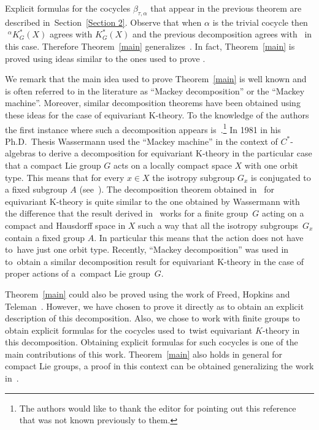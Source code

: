 \documentclass[pdftex]{sigma}
\theoremstyle{definition}
\numberwithin{equation}{section}
\begin{document}
Explicit formulas for the cocycles $\beta_{\tau,\alpha}$ that appear in the previous theorem
are described in~Section~\ref{Section 2}. Observe that when $\alpha$ is the trivial cocycle
then $\phantom{i}^{\alpha}K_{G}^{\ast}(X)$ agrees
with $K_{G}^{*}(X)$ and the previous decomposition agrees with~\cite[Theorem 3.2]{GomezUribe}
in this case. Therefore Theorem~\ref{main} generalizes~\cite[Theorem 3.2]{GomezUribe}. In fact,
Theorem~\ref{main} is proved using ideas similar to the ones used to prove
\cite[Theorem 3.2]{GomezUribe}.


We remark that the main idea used to prove Theorem~\ref{main} is well known and is often referred
to in the literature as ``Mackey decomposition'' or the ``Mackey machine''. Moreover, similar decomposition
theorems have been obtained using these ideas for the case of equivariant K-theory. To the knowledge of
the authors the first instance where such a decomposition appears is~\cite{Wassermann}.\footnote{The authors would like to thank the editor for pointing out this reference that was not
known previously to them.} In 1981 in his Ph.D.~Thesis Wassermann used the ``Mackey machine'' in
the context of $C^{*}$-algebras to derive a decomposition for equivariant K-theory in the particular
case that a compact Lie group $G$ acts on a locally compact space $X$ with one orbit type.
This means that for every $x\in X$ the isotropy subgroup $G_{x}$ is conjugated to a fixed subgroup $A$
(see~\cite[Theorem~7]{Wassermann}). The decomposition theorem obtained in~\cite{GomezUribe} for equivariant
K-theory is quite similar to the one obtained by Wassermann with the difference that the result derived in~\cite{GomezUribe} works for a finite group~$G$ acting on a compact and Hausdorff space in $X$ such a
way that all the isotropy subgroups~$G_{x}$ contain a fixed group $A$. In particular this means that
the action does not have to~have just one orbit type. Recently, ``Mackey decomposition'' was used in~\cite{ABV}
to~obtain a similar decomposition result for equivariant K-theory in the case of proper actions of a~compact Lie
group~$G$.

Theorem~\ref{main} could also be proved using the work of Freed, Hopkins and
Teleman~\cite{FHT}. However, we have chosen to prove it directly as to obtain an explicit
description of this decomposition. Also, we chose to work with finite groups to obtain explicit
formulas for the cocycles used to~twist equivariant $K$-theory in this decomposition.
Obtaining explicit formulas for such cocycles is one of the main contributions of this
work. Theorem~\ref{main} also holds in general for compact Lie groups, a proof in this context can be
obtained generalizing the work in~\cite{AGU}.
\end{document}
